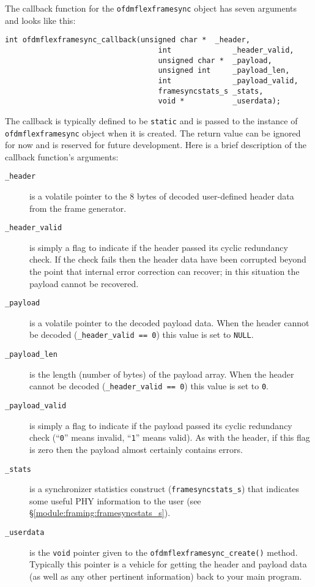 %
%
%
The callback function for the {\tt ofdmflexframesync} object has seven
arguments and looks like this:
%
\begin{Verbatim}[fontsize=\small]
    int ofdmflexframesync_callback(unsigned char *  _header,
                                   int              _header_valid,
                                   unsigned char *  _payload,
                                   unsigned int     _payload_len,
                                   int              _payload_valid,
                                   framesyncstats_s _stats,
                                   void *           _userdata);
\end{Verbatim}
%
The callback is typically defined to be {\tt static} and is passed to
the instance of {\tt ofdmflexframesync} object when it is created.
The return value can be ignored for now and is reserved for future
development.
Here is a brief description of the callback function's arguments:
%
\begin{description}
\item[{\tt \_header}]
    is a volatile pointer to the 8 bytes of decoded user-defined header
    data from the frame generator.
\item[{\tt \_header\_valid}]
    is simply a flag to indicate if the header passed its cyclic
    redundancy check.
    If the check fails then the header data have been corrupted beyond
    the point that internal error correction can recover;
    in this situation the payload cannot be recovered.
\item[{\tt \_payload}]
    is a volatile pointer to the decoded payload data.
    When the header cannot be decoded ({\tt \_header\_valid == 0})
    this value is set to {\tt NULL}.
\item[{\tt \_payload\_len}]
    is the length (number of bytes) of the payload array.
    When the header cannot be decoded ({\tt \_header\_valid == 0})
    this value is set to {\tt 0}.
\item[{\tt \_payload\_valid}]
    is simply a flag to indicate if the payload passed its cyclic
    redundancy check
    (``{\tt 0}'' means invalid, ``{\tt 1}'' means valid).
    As with the header,
    if this flag is zero then the payload almost certainly contains
    errors.
\item[{\tt \_stats}]
    is a synchronizer statistics construct
    ({\tt framesyncstats\_s})
    that indicates some useful PHY information to the user
    (see \S\ref{module:framing:framesyncstats_s}).
\item[{\tt \_userdata}]
    is the {\tt void} pointer given to the
    {\tt ofdmflexframesync\_create()} method.
    Typically this pointer is a vehicle for getting the header and
    payload data (as well as any other pertinent information)
    back to your main program.
\end{description}
%


